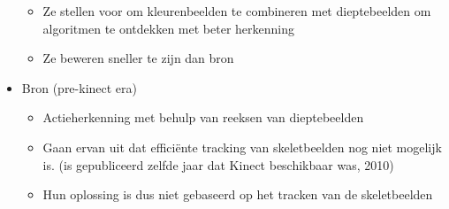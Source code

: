 \begin{itemize}
\begin{itemize}
			\item Ze stellen voor om kleurenbeelden te combineren met dieptebeelden om algoritmen te ontdekken met beter herkenning
			
			\item Ze beweren sneller te zijn dan bron \cite{action-recognition-based-bag-3d-points}
		\end{itemize}
	\item Bron \cite{action-recognition-based-bag-3d-points} (pre-kinect era)
	\begin{itemize}
		\item Actieherkenning met behulp van reeksen van dieptebeelden
		\item Gaan ervan uit dat efficiënte tracking van skeletbeelden nog niet mogelijk is. (is gepubliceerd zelfde jaar dat Kinect beschikbaar was, 2010)
		\item Hun oplossing is dus niet gebaseerd op het tracken van de skeletbeelden
	\end{itemize}


\end{itemize}

